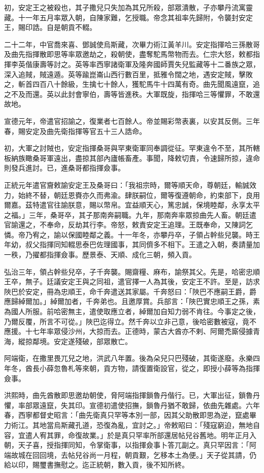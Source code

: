 \begin{pinyinscope}
初，安定王之被殺也，其子撒兒只失加為其兄所殺，部眾潰散，子亦攀丹流寓靈藏。十一年五月率眾入朝，自陳家難，乞授職。帝念其祖率先歸附，令襲封安定王，賜印誥。自是朝貢不輟。

二十二年，中官喬來喜、鄧誠使烏斯藏，次畢力術江黃羊川。安定指揮哈三孫散哥及曲先指揮散即思等率眾邀劫之，殺朝使，盡奪駝馬幣物而去。仁宗大怒，敕都指揮李英偕康壽等討之。英等率西寧諸衛軍及隆奔國師賈失兒監藏等十二番族之眾，深入追賊，賊遠遁。英等踰崑崙山西行數百里，抵雅令闊之地，遇安定賊，擊敗之，斬首四百八十餘級，生擒七十餘人，獲駝馬牛十四萬有奇。曲先聞風遠竄，追之不及而還。英以此封會寧伯，壽等皆進秩。大軍既旋，指揮哈三等懼罪，不敢還故地。

宣德元年，帝遣官招諭之，復業者七百餘人。帝並賜彩幣表裏，以安其反側。三年春，賜安定及曲先衛指揮等官五十三人誥命。

初，大軍之討賊也，安定指揮桑哥與罕東衛軍同奉調從征。罕東違令不至，其所轄板納族瞰桑哥軍遠出，盡掠其部內廬帳畜產。事聞，降敕切責，令速歸所掠，違命則發兵進討。已，進桑哥都指揮僉事。

正統元年遣官齎敕諭安定王及桑哥曰：「我祖宗時，爾等順天命，尊朝廷，輸誠效力，始終不替，朝廷恩賚亦久而弗渝。肆朕嗣位，爾等復遵朝命，約束部下，良用爾嘉。茲特遣官往諭朕意，賜以幣帛。宜益順天心，篤忠誠，保境睦鄰，永享太平之福。」三年，桑哥卒，其子那南奔嗣職。九年，那南奔率眾掠曲先人畜。朝廷遣官諭還之，不奉命，反劫其行李。帝怒，敕責安定王追理。王既奉命，又陳詞乞憐。帝乃宥之，諭以保國睦鄰之義。十一年冬，亦攀丹卒，子領占幹些兒襲。時王年幼，叔父指揮同知輟思泰巴佐理國事，其同儕多不相下。王遣之入朝，奏請量加一秩，乃擢都指揮僉事。歷景泰、天順、成化三朝，頻入貢。

弘治三年，領占幹些兒卒，子千奔襲。賜齋糧、麻布，諭祭其父。先是，哈密忠順王卒，無子。廷議安定王與之同祖，遣官擇一人為其後，安定王不許。至是，訪求陜巴於安定，冊為忠順王，命千奔遣送其家屬。千奔怒曰：「陜巴不應嗣王爵，爵應歸綽爾加。」綽爾加者，千奔弟也。且邀厚賞。兵部言：「陜巴實忠順王之孫，素為國人所服。前哈密無主，遣使取應立者，綽爾加自知力弱不肯往。今事定之後，乃爾反覆，所言不可從。」陜巴迄得立。然千奔以立非己意，後哈密數被寇，竟不應援。十七年率眾侵沙州，大掠而去。正德時，蒙古大酋亦不剌、阿爾禿廝侵據青海，縱掠鄰境。安定遂殘破，部眾散亡。

阿端衛，在撒里畏兀兒之地，洪武八年置。後為朵兒只巴殘破，其衛遂廢。永樂四年冬，酋長小薛忽魯札等來朝，貢方物，請復置衛設官，從之，即授小薛等為指揮僉事。

洪熙時，曲先酋散即思邀劫朝使，脅阿端指揮鎖魯丹偕行。已，大軍出征，鎖魯丹懼，率部眾遠竄，失其印。宣德初遣使招撫，鎖魯丹猶不敢歸，依曲先雜處。六年春，西寧都督史昭言：「曲先衛真只罕等本別一部，因其父助散即思為逆，竄處畢力術江。其地當烏斯藏孔道，恐復為亂，宜討之。」帝敕昭曰：「殘寇窮迫，無地自容，宜遣人宥其罪，命復故業。」於是真只罕率所部還居帖兒谷舊地。明年正月入朝，天子喜，授指揮同知，令掌衛事，以指揮僉事卜答兀副之。真只罕因言：「阿端故城在回回境，去帖兒谷尚一月程，朝貢艱，乞移本土為便。」天子從其請，仍給以印，賜璽書撫慰之。迄正統朝，數入貢，後不知所終。


\end{pinyinscope}

